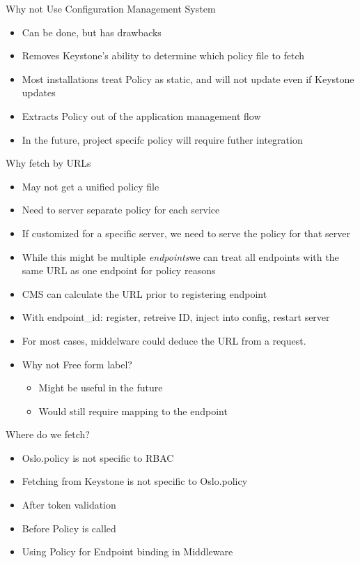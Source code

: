 \documentclass{beamer}
\begin{document}
\begin{frame}{Why not Use Configuration Management System}
  \begin{itemize}
  \item Can be done, but has drawbacks
  \item Removes Keystone's ability to determine which policy file to fetch
  \item Most installations treat Policy as static, and will not update even if Keystone updates
  \item Extracts Policy out of the application management flow
  \item In the future, project specifc policy will require futher integration
  \end{itemize}
\end{frame}


\begin{frame}{Why fetch by URLs}
  \begin{itemize}
  \item May not get a unified policy file
  \item Need to server separate policy for each service
  \item If customized for a specific server, we need to serve the policy for that server
  \item While this might be multiple \textit{endpoints}we can treat all endpoints with the same URL as one endpoint for policy reasons
  \item CMS can calculate the URL prior to registering endpoint
  \item With endpoint\_id: register, retreive ID, inject into config, restart server
  \item For most cases, middelware could deduce the URL from a request.
  \item Why not Free form label?
    \begin{itemize}
    \item Might be useful in the future
    \item Would still require mapping to the endpoint 
    \end{itemize}
  \end{itemize}
\end{frame}


\begin{frame}{Where do we fetch?}
  \begin{itemize}
  \item Oslo.policy is not specific to RBAC
  \item Fetching from Keystone is not specific to Oslo.policy
  \item After token validation
  \item Before Policy is called
  \item Using Policy for Endpoint binding in Middleware
  \end{itemize}
\end{frame}
\end{document}
